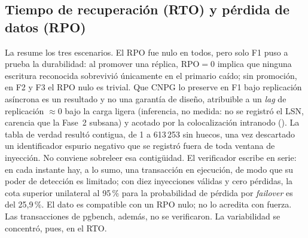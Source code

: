 \subsection{Tiempo de recuperación (RTO) y pérdida de datos (RPO)}\label{sec:rtorpo}
La  resume los tres escenarios. El RPO fue nulo en todos, pero solo F1 puso a prueba la durabilidad: al promover una réplica, $\text{RPO}=0$ implica que ninguna escritura reconocida sobrevivió únicamente en el primario caído; sin promoción, en F2 y F3 el RPO nulo es trivial. Que CNPG lo preserve en F1 bajo replicación asíncrona es un resultado y no una garantía de diseño, atribuible a un \textit{lag} de replicación $\approx 0$ bajo la carga ligera  (inferencia, no medida: no se registró el LSN, carencia que la Fase~2 subsana) y acotado por la colocalización intranodo (). La tabla de verdad resultó contigua, de 1 a 613\,253 sin huecos, una vez descartado un identificador espurio negativo que se registró fuera de toda ventana de inyección. No conviene sobreleer esa contigüidad. El verificador escribe en serie: en cada instante hay, a lo sumo, una transacción en ejecución, de modo que su poder de detección es limitado; con diez inyecciones válidas y cero pérdidas, la cota superior unilateral al 95\,\% para la probabilidad de pérdida por \textit{failover} es del 25,9\,\%. El dato es compatible con un RPO nulo; no lo acredita con fuerza. Las transacciones de pgbench, además, no se verificaron. La variabilidad se concentró, pues, en el RTO.

